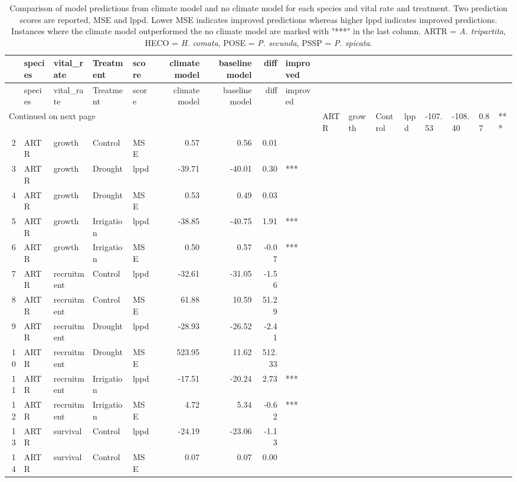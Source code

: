 \begin{longtable}{rllllrrrl}
\caption{Comparison of model predictions from climate model and no climate model for each species and vital rate and treatment.  Two prediction scores are reported, MSE and lppd. Lower MSE indicates improved predictions whereas higher lppd indicates improved predictions.  Instances where the climate model outperformed the no climate model are marked with "***" in the last column. ARTR = \textit{A. tripartita}, HECO = \textit{H. comata}, POSE = \textit{P. secunda}, PSSP = \textit{P. spicata}.} \\ 
  \hline
& species & vital\_rate & Treatment & score & climate model & baseline model & diff & improved \\ 
\hline
\endfirsthead
\hline
& species & vital\_rate & Treatment & score & climate model & baseline model & diff & improved \\ 
\hline
\endhead
\hline
\multicolumn{9}{l}{\footnotesize Continued on next page}
\endfoot
\endlastfoot
1 & ARTR & growth & Control & lppd & -107.53 & -108.40 & 0.87 & *** \\ 
  2 & ARTR & growth & Control & MSE & 0.57 & 0.56 & 0.01 &  \\ 
  3 & ARTR & growth & Drought & lppd & -39.71 & -40.01 & 0.30 & *** \\ 
  4 & ARTR & growth & Drought & MSE & 0.53 & 0.49 & 0.03 &  \\ 
  5 & ARTR & growth & Irrigation & lppd & -38.85 & -40.75 & 1.91 & *** \\ 
  6 & ARTR & growth & Irrigation & MSE & 0.50 & 0.57 & -0.07 & *** \\ 
  7 & ARTR & recruitment & Control & lppd & -32.61 & -31.05 & -1.56 &  \\ 
  8 & ARTR & recruitment & Control & MSE & 61.88 & 10.59 & 51.29 &  \\ 
  9 & ARTR & recruitment & Drought & lppd & -28.93 & -26.52 & -2.41 &  \\ 
  10 & ARTR & recruitment & Drought & MSE & 523.95 & 11.62 & 512.33 &  \\ 
  11 & ARTR & recruitment & Irrigation & lppd & -17.51 & -20.24 & 2.73 & *** \\ 
  12 & ARTR & recruitment & Irrigation & MSE & 4.72 & 5.34 & -0.62 & *** \\ 
  13 & ARTR & survival & Control & lppd & -24.19 & -23.06 & -1.13 &  \\ 
  14 & ARTR & survival & Control & MSE & 0.07 & 0.07 & 0.00 &  \\ 

\end{longtable}
